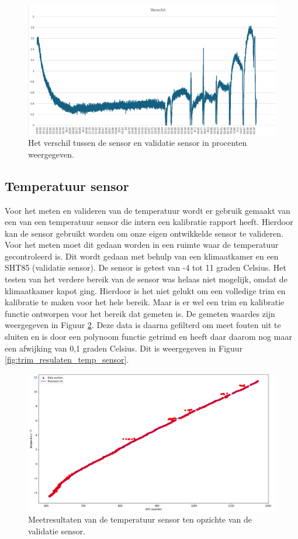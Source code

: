 \begin{figure}[H]
    \centering
    \includegraphics[width=0.75\linewidth]{pictures/meetresultaten_luchtvochtigheid.png}
    \caption{Het verschil tussen de sensor en validatie sensor in procenten weergegeven.}
    \label{fig:meet_result_luchtvochtigheid}
\end{figure}

\subsection{Temperatuur sensor}
Voor het meten en valideren van de temperatuur wordt er gebruik gemaakt van een van een temperatuur sensor die intern een kalibratie rapport heeft. Hierdoor kan de sensor gebruikt worden om onze eigen ontwikkelde sensor te valideren. Voor het meten moet dit gedaan worden in een ruimte waar de temperatuur gecontroleerd is. Dit wordt gedaan met behulp van een klimaatkamer en een SHT85 (validatie sensor). De sensor is getest van -4 tot 11 graden Celsius. Het testen van het verdere bereik van de sensor was helaas niet mogelijk, omdat de klimaatkamer kapot ging. Hierdoor is het niet gelukt om een volledige trim en kalibratie te maken voor het hele bereik. Maar is er wel een trim en kalibratie functie ontworpen voor het bereik dat gemeten is. De gemeten waardes zijn weergegeven in Figuur \ref{fig:meet_result_temp_sensors}. Deze data is daarna gefilterd om meet fouten uit te sluiten en is door een polynoom functie getrimd en heeft daar daarom nog maar een afwijking van 0,1 graden Celsius. Dit is weergegeven in Figuur \ref{fig:trim_resulaten_temp_sensor}.
\begin{figure}[H]
    \centering
    \includegraphics[width=0.75\linewidth]{pictures/meet_resultaten_temp_sensor.png}
    \caption{Meetresultaten van de temperatuur sensor ten opzichte van de validatie sensor.}
    \label{fig:meet_result_temp_sensors}
\end{figure}

